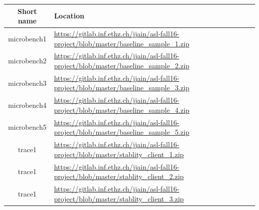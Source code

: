 \documentclass[11pt]{article}
\begin{document}
\begin{tabular}{|c|l|}
\hline \textbf{Short name }& \textbf{Location} \\ 
\hline microbench1 & \url{https://gitlab.inf.ethz.ch/jjain/asl-fall16-project/blob/master/baseline_sample_1.zip} \\ 
\hline microbench2 & \url{https://gitlab.inf.ethz.ch/jjain/asl-fall16-project/blob/master/baseline_sample_2.zip} \\
\hline microbench3 & \url{https://gitlab.inf.ethz.ch/jjain/asl-fall16-project/blob/master/baseline_sample_3.zip} \\
\hline microbench4 & \url{https://gitlab.inf.ethz.ch/jjain/asl-fall16-project/blob/master/baseline_sample_4.zip} \\
\hline microbench5 & \url{https://gitlab.inf.ethz.ch/jjain/asl-fall16-project/blob/master/baseline_sample_5.zip} \\
\hline trace1 & \url{https://gitlab.inf.ethz.ch/jjain/asl-fall16-project/blob/master/stablity_client_1.zip} \\ 
\hline trace1 & \url{https://gitlab.inf.ethz.ch/jjain/asl-fall16-project/blob/master/stablity_client_2.zip} \\ 
\hline trace1 & \url{https://gitlab.inf.ethz.ch/jjain/asl-fall16-project/blob/master/stablity_client_3.zip} \\ 
\hline 
\end{tabular} 
\end{document}
